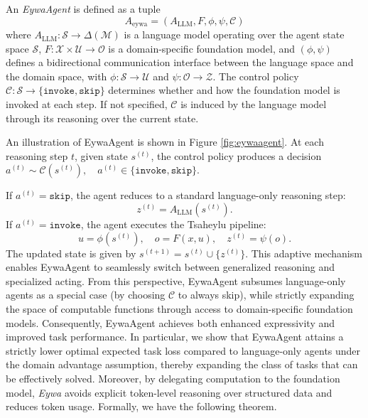 \documentclass{llmxive}
\begin{document}
{\begin{tcolorbox}[
  agentscope,
  float,
  floatplacement=h,
  title=\textbf{EywaAgent}
]
\begin{definition}[EywaAgent]
An \textit{EywaAgent} is defined as a tuple
\begin{equation}
A_{\mathrm{eywa}} = (A_{\mathrm{LLM}}, F, \phi, \psi, \mathcal{C})
\end{equation}
where $A_{\mathrm{LLM}} : \mathcal{S} \to \Delta(\mathcal{M})$ is a language model operating over the agent state space $\mathcal{S}$, $F : \mathcal{X} \times \mathcal{U} \to \mathcal{O}$ is a domain-specific foundation model, and $(\phi, \psi)$ defines a bidirectional communication interface between the language space and the domain space, with $\phi : \mathcal{S} \to \mathcal{U}$ and $\psi : \mathcal{O} \to \mathcal{Z}$.
The control policy $\mathcal{C} : \mathcal{S} \to \{\texttt{invoke}, \texttt{skip}\}$ determines whether and how the foundation model is invoked at each step. If not specified, $\mathcal{C}$ is induced by the language model through its reasoning over the current state.
\end{definition}
\end{tcolorbox}

An illustration of EywaAgent is shown in Figure \ref{fig:eywaagent}. At each reasoning step $t$, given state $s^{(t)}$, the control policy produces a decision $ a^{(t)} \sim \mathcal{C}(s^{(t)}), \quad a^{(t)} \in \{ \texttt{invoke}, \texttt{skip} \}$.

If $a^{(t)} = \texttt{skip}$, the agent reduces to a standard language-only reasoning step:
\begin{equation}
z^{(t)} = A_{\mathrm{LLM}}(s^{(t)}).
\end{equation}
If $a^{(t)} = \texttt{invoke}$, the agent executes the Tsaheylu pipeline:
\begin{equation}
u = \phi(s^{(t)}), \quad
o = F(x, u), \quad
z^{(t)} = \psi(o).
\end{equation}
The updated state is given by $s^{(t+1)} = s^{(t)} \cup \{z^{(t)}\}$. This adaptive mechanism enables EywaAgent to seamlessly switch between generalized reasoning and specialized acting.
From this perspective, EywaAgent subsumes language-only agents as a special case (by choosing $\mathcal{C}$ to always skip), while strictly expanding the space of computable functions through access to domain-specific foundation models. Consequently, EywaAgent achieves both enhanced expressivity and improved task performance.
In particular, we show that EywaAgent attains a strictly lower optimal expected task loss compared to language-only agents under the domain advantage assumption, thereby expanding the class of tasks that can be effectively solved.
Moreover, by delegating computation to the foundation model, \textit{Eywa} avoids explicit token-level reasoning over structured data and reduces token usage. Formally, we have the following theorem.


}
\end{document}

